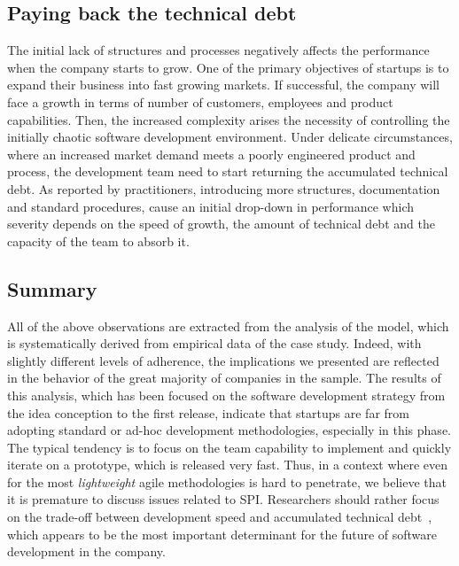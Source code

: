 \documentclass[10pt,journal,letterpaper,compsoc]{IEEEtran}
\begin{document}
\subsection{Paying back the technical debt} 
The initial lack of structures and processes negatively affects the 
performance when the company starts to grow.
One of the primary objectives of startups is to expand their business into fast
growing markets. If successful, the company will face a growth in terms of
number of customers, employees and product capabilities. Then, the increased
complexity arises the necessity of controlling the initially chaotic software
development environment. Under delicate circumstances, where an increased
market demand meets a poorly engineered product and process, the development
team need to start returning the accumulated technical debt. As reported by
practitioners, introducing more structures, documentation and standard
procedures, cause an initial drop-down in performance which severity depends on
the speed of growth, the amount of technical debt and the capacity of the team
to absorb it. 



\subsection{Summary} All of the above observations are extracted from the
analysis of the model, which is systematically derived from empirical data of
the case study. Indeed, with slightly different levels of adherence, the
implications we presented are reflected in the behavior of the great majority
of companies in the sample. The results of this analysis, which has been
focused on the software development strategy from the idea conception to the
first release, indicate that startups are far from adopting standard or ad-hoc
development methodologies, especially in this phase. The typical tendency is to
focus on the team capability to implement and quickly iterate on a prototype,
which is released very fast. Thus, in a context where even for the most
\textit{lightweight} agile methodologies is hard to penetrate, we believe that
it is premature to discuss issues related to SPI. Researchers should rather
focus on the trade-off between development speed and accumulated technical 
debt~\cite{Brown:2010:MTD:1882362.1882373}, which appears to be the most 
important determinant for the future of software development in the company.
\end{document}
